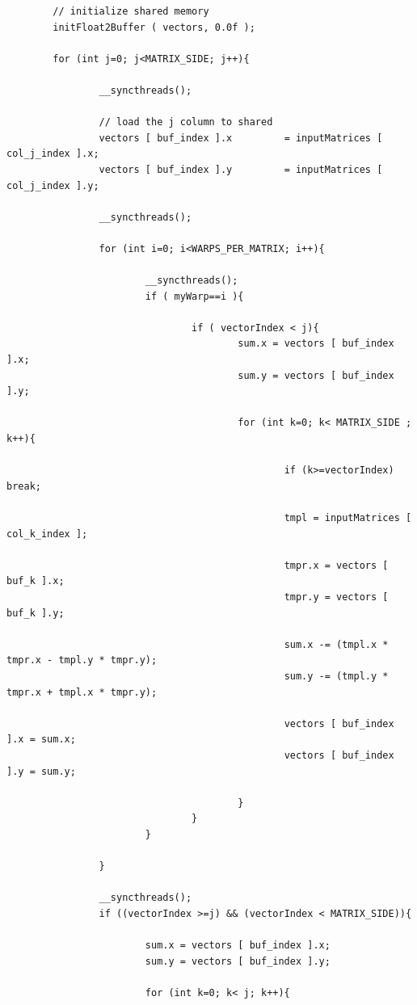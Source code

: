 \documentclass[letter, 12pt]{article}
\begin{document}
\begin{verbatim}
        // initialize shared memory
        initFloat2Buffer ( vectors, 0.0f );

        for (int j=0; j<MATRIX_SIDE; j++){

                __syncthreads();

                // load the j column to shared
                vectors [ buf_index ].x         = inputMatrices [ col_j_index ].x;
                vectors [ buf_index ].y         = inputMatrices [ col_j_index ].y;

                __syncthreads();

                for (int i=0; i<WARPS_PER_MATRIX; i++){

                        __syncthreads();
                        if ( myWarp==i ){

                                if ( vectorIndex < j){
                                        sum.x = vectors [ buf_index ].x;
                                        sum.y = vectors [ buf_index ].y;

                                        for (int k=0; k< MATRIX_SIDE ; k++){

                                                if (k>=vectorIndex) break;

                                                tmpl = inputMatrices [ col_k_index ];

                                                tmpr.x = vectors [ buf_k ].x;
                                                tmpr.y = vectors [ buf_k ].y;

                                                sum.x -= (tmpl.x * tmpr.x - tmpl.y * tmpr.y);
                                                sum.y -= (tmpl.y * tmpr.x + tmpl.x * tmpr.y);

                                                vectors [ buf_index ].x = sum.x;
                                                vectors [ buf_index ].y = sum.y;

                                        }
                                }
                        }

                }

                __syncthreads();
                if ((vectorIndex >=j) && (vectorIndex < MATRIX_SIDE)){

                        sum.x = vectors [ buf_index ].x;
                        sum.y = vectors [ buf_index ].y;

                        for (int k=0; k< j; k++){


\end{verbatim}
\end{document}
